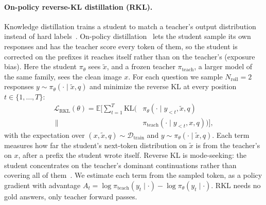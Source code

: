 \paragraph{On-policy reverse-KL distillation (RKL).}
Knowledge distillation trains a student to match a teacher's output distribution instead
of hard labels~\cite{hinton2015distilling}. On-policy
distillation~\cite{agarwal2024onpolicydistillationlanguagemodels} lets the student sample
its own responses and has the teacher score every token of them, so the student is
corrected on the prefixes it reaches itself rather than on the teacher's (exposure bias).
Here the student $\pi_\theta$ sees $\tilde{x}$, and a frozen teacher
$\pi_{\mathrm{teach}}$, a larger model of the same family, sees the clean image $x$. For
each question we sample $N_{\mathrm{roll}} = 2$ responses
$y \sim \pi_\theta(\cdot \mid \tilde{x}, q)$ and minimize the reverse KL at every position
$t \in \{1,\dots,T\}$:
\begin{equation}
\begin{aligned}
\mathcal{L}_{\mathrm{RKL}}(\theta) = \mathbb{E}\Big[\textstyle\sum_{t=1}^{T}
\mathrm{KL}\big(&\pi_\theta(\cdot \mid y_{<t}, \tilde{x}, q) \\
\,\big\|\,&\pi_{\mathrm{teach}}(\cdot \mid y_{<t}, x, q)\big)\Big],
\end{aligned}
\label{eq:rkl}
\end{equation}
with the expectation over $(x, \tilde{x}, q) \sim \mathcal{D}_{\mathrm{train}}$ and
$y \sim \pi_\theta(\cdot \mid \tilde{x}, q)$. Each term measures how far the student's
next-token distribution on $\tilde{x}$ is from the teacher's on $x$, after a prefix the
student wrote itself. Reverse KL is mode-seeking: the student concentrates on the
teacher's dominant continuations rather than covering all of them~\cite{gu2024minillm}. We
estimate each term from the sampled token, as a policy gradient with advantage
$A_t = \log \pi_{\mathrm{teach}}(y_t \mid \cdot) - \log \pi_\theta(y_t \mid \cdot)$.
RKL needs
no gold answers, only teacher forward passes.

